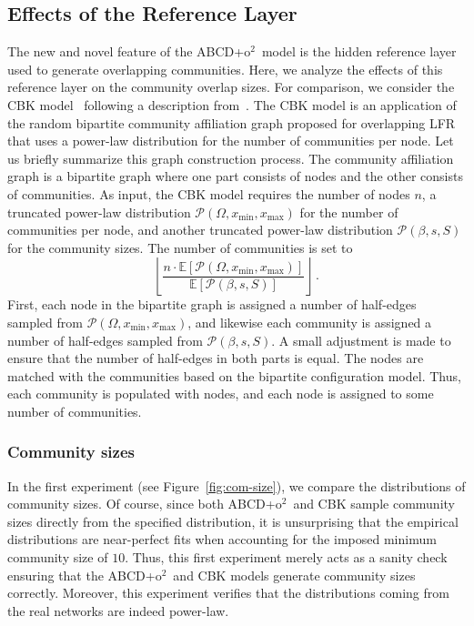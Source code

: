 \documentclass[review,los,12pt]{ryethesis}
\newcommand{\E}{{\mathbb E}}
\newcommand{\abcdoo}{{ABCD+o$^2$}}
\newcommand{\lfr}{{LFR}}
\newcommand{\tpl}[3]{\ensuremath{\mathcal{P}\left(#1,#2,#3\right)}}
\begin{document}
\subsection{Effects of the Reference Layer} \label{sec:effects_of_reference_layer}
The new and novel feature of the \abcdoo\ model is the hidden reference layer used to generate overlapping communities.
Here, we analyze the effects of this reference layer on the community overlap sizes.
For comparison, we consider the CBK model~\cite{chykhradze2014CBK} following a description from~\cite{sengupta2017CBKdescription}.
The CBK model is an application of the random bipartite community affiliation graph proposed for overlapping \lfr~\cite{lfro} that uses a power-law distribution for the number of communities per node.
Let us briefly summarize this graph construction process.
The community affiliation graph is a bipartite graph where one part consists of nodes and the other consists of communities.
As input, the CBK model requires the number of nodes $n$, a truncated power-law distribution $\tpl{\Omega}{x_{\min}}{x_{\max}}$ for the number of communities per node, and another truncated power-law distribution $\tpl{\beta}{s}{S}$ for the community sizes.
The number of communities is set to 
\[
\left\lfloor \frac{n \cdot \E[\tpl{\Omega}{x_{\min}}{x_{\max}}]}{\E[\tpl{\beta}{s}{S}]} \right\rfloor \,.
\]
First, each node in the bipartite graph is assigned a number of half-edges sampled from $\tpl{\Omega}{x_{\min}}{x_{\max}}$, and likewise each community is assigned a number of half-edges sampled from $\tpl{\beta}{s}{S}$.
A small adjustment is made to ensure that the number of half-edges in both parts is equal.
The nodes are matched with the communities based on the bipartite configuration model.
Thus, each community is populated with nodes, and each node is assigned to some number of communities. 

\subsubsection*{Community sizes}
In the first experiment (see Figure~\ref{fig:com-size}), we compare the distributions of community sizes.
Of course, since both \abcdoo\ and CBK sample community sizes directly from the specified distribution, it is unsurprising that the empirical distributions are near-perfect fits when accounting for the imposed minimum community size of $10$.
Thus, this first experiment merely acts as a sanity check ensuring that the \abcdoo\ and CBK models generate community sizes correctly.
Moreover, this experiment verifies that the distributions coming from the real networks are indeed power-law.
\end{document}
